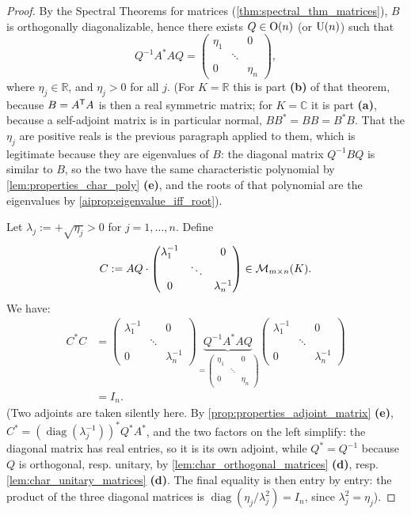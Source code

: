 \begin{proof}
By the Spectral Theorems for matrices (\cref{thm:spectral_thm_matrices}), $B$ is orthogonally diagonalizable, hence there exists $Q \in \operatorname{O}(n)$ (or $\operatorname{U}(n)$) such that
\[
Q^{-1} A^* A Q = \begin{pmatrix} \eta_1 & & 0 \\ & \ddots & \\ 0 & & \eta_n \end{pmatrix},
\]
where $\eta_j \in \mathbb{R}$, and $\eta_j > 0$ for all $j$.
(For $K = \mathbb{R}$ this is part \textbf{(b)} of that theorem, because $B = A^{\mathsf{T}} A$ is then a real symmetric matrix; for $K = \mathbb{C}$ it is part \textbf{(a)}, because a self-adjoint matrix is in particular normal, $B B^* = B B = B^* B$. That the $\eta_j$ are positive reals is the previous paragraph applied to them, which is legitimate because they are eigenvalues of $B$: the diagonal matrix $Q^{-1} B Q$ is similar to $B$, so the two have the same characteristic polynomial by \cref{lem:properties_char_poly} \textbf{(e)}, and the roots of that polynomial are the eigenvalues by \cref{aiprop:eigenvalue_iff_root}).

Let $\lambda_j := +\sqrt{\eta_j} > 0$ for $j = 1, \dots, n$.
Define
\[
C := A Q \cdot \begin{pmatrix} \lambda_1^{-1} & & 0 \\ & \ddots & \\ 0 & & \lambda_n^{-1} \end{pmatrix} \in \mathcal{M}_{m \times n}(K).
\]
We have:
\begin{align*}
C^* C &= \begin{pmatrix} \lambda_1^{-1} & & 0 \\ & \ddots & \\ 0 & & \lambda_n^{-1} \end{pmatrix} \underbrace{Q^{-1} A^* A Q}_{=\begin{pmatrix} \eta_1 & & 0 \\ & \ddots & \\ 0 & & \eta_n \end{pmatrix}} \begin{pmatrix} \lambda_1^{-1} & & 0 \\ & \ddots & \\ 0 & & \lambda_n^{-1} \end{pmatrix} \\
&= I_n.
\end{align*}
(Two adjoints are taken silently here. By \cref{prop:properties_adjoint_matrix} \textbf{(e)}, $C^* = \left(\operatorname{diag}(\lambda_j^{-1})\right)^* Q^* A^*$, and the two factors on the left simplify: the diagonal matrix has real entries, so it is its own adjoint, while $Q^* = Q^{-1}$ because $Q$ is orthogonal, resp. unitary, by \cref{lem:char_orthogonal_matrices} \textbf{(d)}, resp. \cref{lem:char_unitary_matrices} \textbf{(d)}. The final equality is then entry by entry: the product of the three diagonal matrices is $\operatorname{diag}(\eta_j / \lambda_j^2) = I_n$, since $\lambda_j^2 = \eta_j$).


\end{proof}
